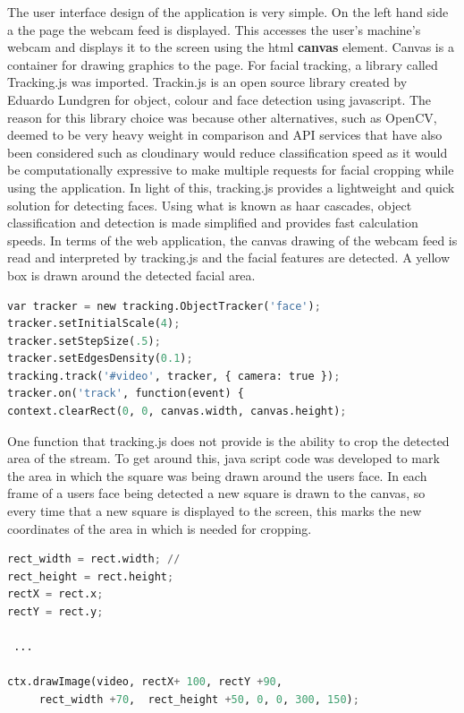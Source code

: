 The user interface design of the application is very simple. On the left hand side a the page the webcam feed is displayed. This accesses the user's machine's webcam and displays it to the screen using the html \textbf{canvas} element. Canvas is a container for drawing graphics to the page. For facial tracking, a library called Tracking.js was imported. Trackin.js is an open source library created by Eduardo Lundgren for object, colour and face detection using javascript. The reason for this library choice was because other alternatives, such as OpenCV, deemed to be very heavy weight in comparison and API services that have also been considered such as cloudinary would reduce classification speed as it would be computationally expressive to make multiple requests for facial cropping while using the application. 
In light of this, tracking.js provides a lightweight and quick solution for detecting faces. Using what is known as haar cascades, object classification and detection is made simplified and provides fast calculation speeds. In terms of the web application, the canvas drawing of the webcam feed is read and interpreted by tracking.js and the facial features are detected. A yellow box is drawn around the detected facial area.
\begin{lstlisting}[language=python, frame=single]
var tracker = new tracking.ObjectTracker('face');
tracker.setInitialScale(4);
tracker.setStepSize(.5);
tracker.setEdgesDensity(0.1);
tracking.track('#video', tracker, { camera: true });
tracker.on('track', function(event) {
context.clearRect(0, 0, canvas.width, canvas.height);
\end{lstlisting}

One function that tracking.js does not provide is the ability to crop the detected area of the stream. To get around this, java script code was developed to mark the area in which the square was being drawn around the users face. In each frame of a users face being detected a new square is drawn to the canvas, so every time that a new square is displayed to the screen, this marks the new coordinates of the area in which is needed for cropping. 

\begin{lstlisting}[language=python, frame=single]
rect_width = rect.width; // 
rect_height = rect.height;
rectX = rect.x;
rectY = rect.y;

 ...

ctx.drawImage(video, rectX+ 100, rectY +90,
	 rect_width +70,  rect_height +50, 0, 0, 300, 150);
\end{lstlisting}

